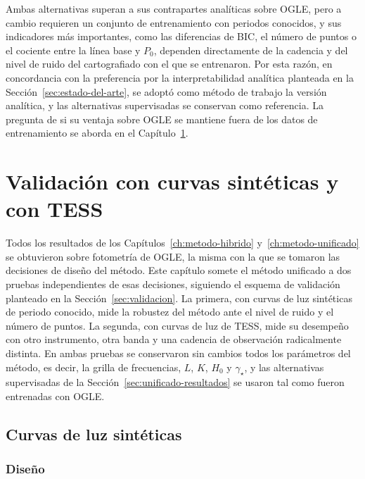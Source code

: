\documentclass[12pt,letterpaper,oneside]{book}
\begin{document}
Ambas alternativas superan a sus contrapartes anal\'iticas sobre OGLE, pero a cambio requieren un conjunto de entrenamiento con periodos conocidos, y sus indicadores m\'as importantes, como las diferencias de BIC, el n\'umero de puntos o el cociente entre la l\'inea base y $P_0$, dependen directamente de la cadencia y del nivel de ruido del cartografiado con el que se entrenaron. Por esta raz\'on, en concordancia con la preferencia por la interpretabilidad anal\'itica planteada en la Secci\'on~\ref{sec:estado-del-arte}, se adopt\'o como m\'etodo de trabajo la versi\'on anal\'itica, y las alternativas supervisadas se conservan como referencia. La pregunta de si su ventaja sobre OGLE se mantiene fuera de los datos de entrenamiento se aborda en el Cap\'itulo~\ref{ch:validacion}.


\chapter{Validaci\'on con curvas sint\'eticas y con TESS}
\label{ch:validacion}

Todos los resultados de los Cap\'itulos~\ref{ch:metodo-hibrido} y~\ref{ch:metodo-unificado} se obtuvieron sobre fotometr\'ia de OGLE, la misma con la que se tomaron las decisiones de dise\~no del m\'etodo. Este cap\'itulo somete el m\'etodo unificado a dos pruebas independientes de esas decisiones, siguiendo el esquema de validaci\'on planteado en la Secci\'on~\ref{sec:validacion}. La primera, con curvas de luz sint\'eticas de periodo conocido, mide la robustez del m\'etodo ante el nivel de ruido y el n\'umero de puntos. La segunda, con curvas de luz de TESS, mide su desempe\~no con otro instrumento, otra banda y una cadencia de observaci\'on radicalmente distinta. En ambas pruebas se conservaron sin cambios todos los par\'ametros del m\'etodo, es decir, la grilla de frecuencias, $L$, $K$, $H_0$ y $\gamma_\star$, y las alternativas supervisadas de la Secci\'on~\ref{sec:unificado-resultados} se usaron tal como fueron entrenadas con OGLE.

\section{Curvas de luz sint\'eticas}
\label{sec:validacion-sinteticas}

\subsection{Dise\~no}
\end{document}
